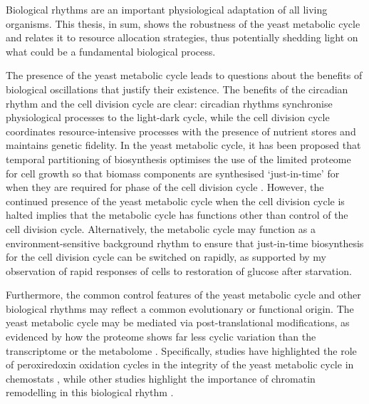 Biological rhythms are an important physiological adaptation of all living organisms.
This thesis, in sum, shows the robustness of the yeast metabolic cycle and relates it to resource allocation strategies, thus potentially shedding light on what could be a fundamental biological process.

The presence of the yeast metabolic cycle leads to questions about the benefits of biological oscillations that justify their existence.
The benefits of the circadian rhythm and the cell division cycle are clear: circadian rhythms synchronise physiological processes to the light-dark cycle, while the cell division cycle coordinates resource-intensive processes with the presence of nutrient stores and maintains genetic fidelity.
In the yeast metabolic cycle, it has been proposed that temporal partitioning of biosynthesis optimises the use of the limited proteome for cell growth \parencite{oneillEukaryoticCellBiology2020,takhaveevTemporalSegregationBiosynthetic2023} so that biomass components are synthesised `just-in-time' for when they are required for phase of the cell division cycle \parencite{zylstraMetabolicDynamicsCell2022}.
However, the continued presence of the yeast metabolic cycle when the cell division cycle is halted implies that the metabolic cycle has functions other than control of the cell division cycle.
Alternatively, the metabolic cycle may function as a environment-sensitive background rhythm to ensure that just-in-time biosynthesis for the cell division cycle can be switched on rapidly, as supported by my observation of rapid responses of cells to restoration of glucose after starvation.

Furthermore, the common control features of the yeast metabolic cycle and other biological rhythms may reflect a common evolutionary or functional origin.
The yeast metabolic cycle may be mediated via post-translational modifications, as evidenced by how the proteome shows far less cyclic variation than the transcriptome \parencite{felthamTranscriptionalChangesAre2020} or the metabolome \parencite{oneillEukaryoticCellBiology2020}.
Specifically, studies have highlighted the role of peroxiredoxin oxidation cycles in the integrity of the yeast metabolic cycle in chemostats \parencite{caustonMetabolicCyclesYeast2015,amponsahPeroxiredoxinsCoupleMetabolism2021}, while other studies highlight the importance of chromatin remodelling in this biological rhythm \parencite{nocettiNucleosomeRepositioningUnderlies2016,gowansINO80ChromatinRemodeling2018}.

